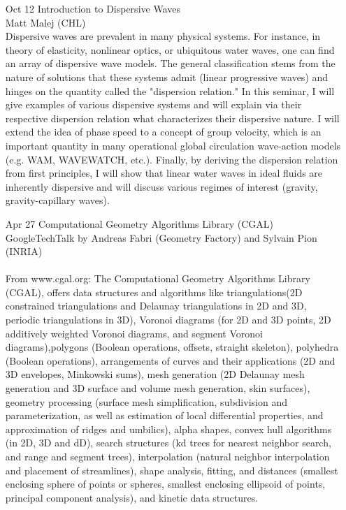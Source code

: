 \documentclass[12]{article}
\begin{document}
\begin{enumerate}
\item[Oct 12] Introduction to Dispersive Waves\\ Matt Malej
  (CHL)\\ Dispersive waves are prevalent in many physical systems.
  For instance, in theory of elasticity, nonlinear optics, or
  ubiquitous water waves, one can find an array of dispersive wave
  models. The general classification stems from the nature of
  solutions that these systems admit (linear progressive waves) and
  hinges on the quantity called the "dispersion relation."  In this
  seminar, I will give examples of various dispersive systems and will
  explain via their respective dispersion relation what characterizes
  their dispersive nature.  I will extend the idea of phase speed to a
  concept of group velocity, which is an important quantity in many
  operational global circulation wave-action models (e.g. WAM,
  WAVEWATCH, etc.). Finally, by deriving the dispersion relation from
  first principles, I will show that linear water waves in ideal
  fluids are inherently dispersive and will discuss various regimes of
  interest (gravity, gravity-capillary waves).

\item[Apr 27]Computational Geometry Algorithms Library (CGAL)\\GoogleTechTalk by Andreas Fabri (Geometry Factory) and Sylvain Pion (INRIA)\\
\\
From www.cgal.org: The Computational Geometry Algorithms Library (CGAL), offers data structures and algorithms like triangulations(2D constrained triangulations and Delaunay triangulations in 2D and 3D, periodic triangulations in 3D), Voronoi diagrams (for 2D and 3D points, 2D additively weighted Voronoi diagrams, and segment Voronoi diagrams),polygons (Boolean operations, offsets, straight skeleton), polyhedra (Boolean operations), arrangements of curves and their applications (2D and 3D envelopes, Minkowski sums), mesh generation (2D Delaunay mesh generation and 3D surface and volume mesh generation, skin surfaces), geometry processing (surface mesh simplification, subdivision and parameterization, as well as estimation of local differential properties, and approximation of ridges and umbilics), alpha shapes, convex hull algorithms (in 2D, 3D and dD), search structures (kd trees for nearest neighbor search, and range and segment trees), interpolation (natural neighbor interpolation and placement of streamlines), shape analysis, fitting, and distances (smallest enclosing sphere of points or spheres, smallest enclosing ellipsoid of points, principal component analysis), and kinetic data structures.


\end{enumerate}
\end{document}
